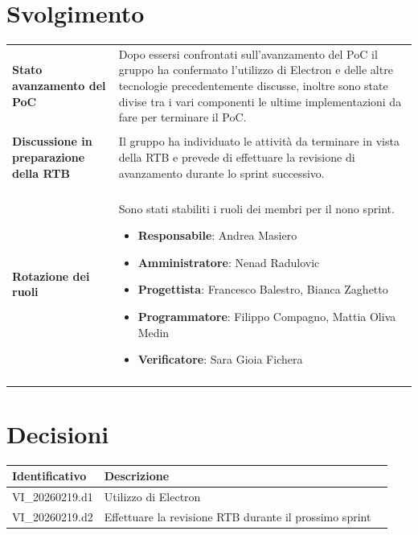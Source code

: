 \documentclass[a4paper,12pt]{article}
\begin{document}
    \section{Svolgimento} {
        \begin{longtable}{P{5cm}|P{10cm}} 
            \textbf{Stato avanzamento del PoC} & Dopo essersi confrontati sull'avanzamento del PoC il gruppo ha confermato l'utilizzo di Electron e delle altre tecnologie precedentemente discusse, inoltre sono state divise tra i vari componenti le ultime implementazioni da fare per terminare il PoC.\\\\
            \textbf{Discussione in preparazione della RTB} & Il gruppo ha individuato le attività da terminare in vista della RTB e prevede di effettuare la revisione di avanzamento durante lo sprint successivo.\\\\
            \textbf{Rotazione dei ruoli} & Sono stati stabiliti i ruoli dei membri per il nono sprint.
            \begin{itemize}
                \item \textbf{Responsabile}: Andrea Masiero
                \item \textbf{Amministratore}: Nenad Radulovic
                \item \textbf{Progettista}: Francesco Balestro, Bianca Zaghetto
                \item \textbf{Programmatore}: Filippo Compagno, Mattia Oliva Medin
                \item \textbf{Verificatore}: Sara Gioia Fichera
            \end{itemize}\\\\
        \end{longtable}
    }

    \section{Decisioni} {
        \begin{tabularx}{\textwidth}{|l|X|l|}
            \hline
            \textbf{Identificativo} & \textbf{Descrizione}\\
            \hline
            VI\_20260219.d1 & Utilizzo di Electron\\
            \hline
            VI\_20260219.d2 & Effettuare la revisione RTB durante il prossimo sprint\\
            \hline
        \end{tabularx}
    }
    \newpage
\end{document}
